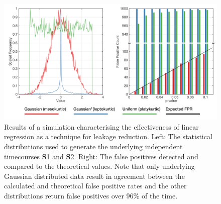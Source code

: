 \begin{figure}[h!]
	\begin{center}
		\includegraphics[width=\linewidth]{./images/chapter3/kurtosis.png}\caption{Results of a simulation characterising the effectiveness of linear
			regression as a technique for leakage reduction. Left: The statistical distributions used
			to generate the underlying independent timecourses \textbf{S}1 and \textbf{S}2. Right: The false positives
			detected and compared to the theoretical values. Note that only underlying Gaussian
			distributed data result in agreement between the calculated and theoretical false positive
			rates and the other distributions return false positives over 96\% of the time. \label{figure_3_kurt}}
	\end{center}
\end{figure}

\clearpage
